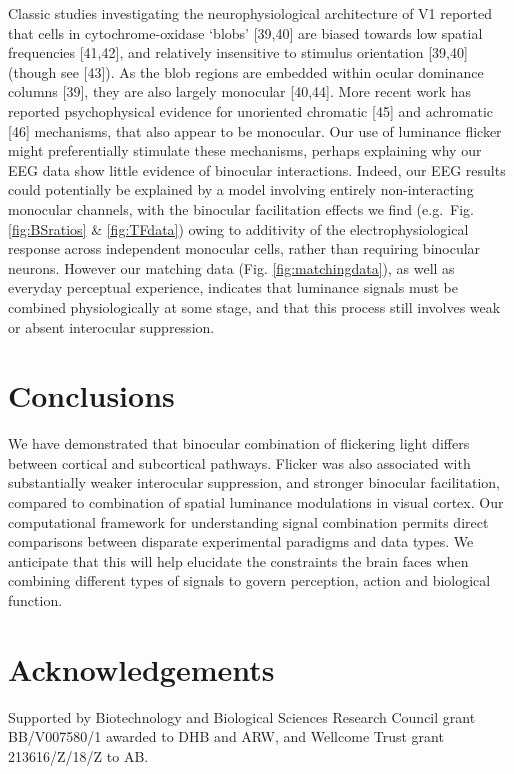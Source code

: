 \documentclass[
]{article}
\begin{document}
Classic studies investigating the neurophysiological architecture of V1 reported that cells in cytochrome-oxidase `blobs' {[}39,40{]} are biased towards low spatial frequencies {[}41,42{]}, and relatively insensitive to stimulus orientation {[}39,40{]} (though see {[}43{]}). As the blob regions are embedded within ocular dominance columns {[}39{]}, they are also largely monocular {[}40,44{]}. More recent work has reported psychophysical evidence for unoriented chromatic {[}45{]} and achromatic {[}46{]} mechanisms, that also appear to be monocular. Our use of luminance flicker might preferentially stimulate these mechanisms, perhaps explaining why our EEG data show little evidence of binocular interactions. Indeed, our EEG results could potentially be explained by a model involving entirely non-interacting monocular channels, with the binocular facilitation effects we find (e.g.~Fig. \ref{fig:BSratios} \& \ref{fig:TFdata}) owing to additivity of the electrophysiological response across independent monocular cells, rather than requiring binocular neurons. However our matching data (Fig. \ref{fig:matchingdata}), as well as everyday perceptual experience, indicates that luminance signals must be combined physiologically at some stage, and that this process still involves weak or absent interocular suppression.

\hypertarget{conclusions}{%
\section{Conclusions}\label{conclusions}}

We have demonstrated that binocular combination of flickering light differs between cortical and subcortical pathways. Flicker was also associated with substantially weaker interocular suppression, and stronger binocular facilitation, compared to combination of spatial luminance modulations in visual cortex. Our computational framework for understanding signal combination permits direct comparisons between disparate experimental paradigms and data types. We anticipate that this will help elucidate the constraints the brain faces when combining different types of signals to govern perception, action and biological function.

\hypertarget{acknowledgements}{%
\section{Acknowledgements}\label{acknowledgements}}

Supported by Biotechnology and Biological Sciences Research Council grant BB/V007580/1 awarded to DHB and ARW, and Wellcome Trust grant 213616/Z/18/Z to AB.
\end{document}
